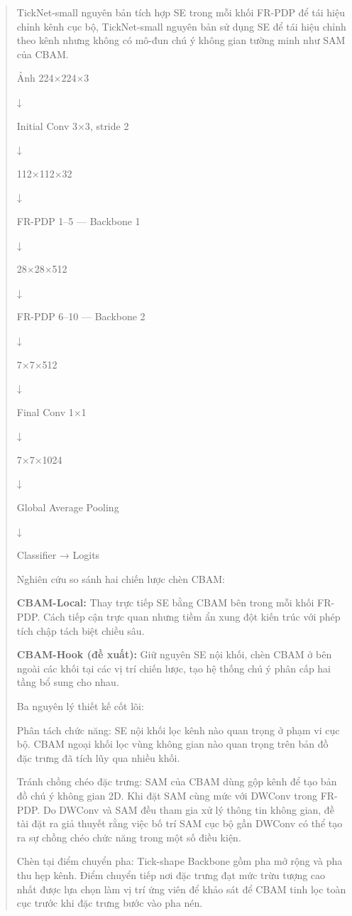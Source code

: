 \documentclass[
  12pt,
  a4paper,
]{report}
\begin{document}
\begin{quote}
TickNet-small nguyên bản tích hợp SE trong mỗi khối FR-PDP để tái hiệu
chỉnh kênh cục bộ, TickNet-small nguyên bản sử dụng SE để tái hiệu chỉnh
theo kênh nhưng không có mô-đun chú ý không gian tường minh như SAM của
CBAM.

Ảnh 224×224×3

↓

Initial Conv 3×3, stride 2

↓

112×112×32

↓

FR-PDP 1--5 --- Backbone 1

↓

28×28×512

↓

FR-PDP 6--10 --- Backbone 2

↓

7×7×512

↓

Final Conv 1×1

↓

7×7×1024

↓

Global Average Pooling

↓

Classifier → Logits

Nghiên cứu so sánh hai chiến lược chèn CBAM:

\textbf{CBAM-Local:} Thay trực tiếp SE bằng CBAM bên trong mỗi khối
FR-PDP. Cách tiếp cận trực quan nhưng tiềm ẩn xung đột kiến trúc với
phép tích chập tách biệt chiều sâu.

\textbf{CBAM-Hook (đề xuất):} Giữ nguyên SE nội khối, chèn CBAM ở bên
ngoài các khối tại các vị trí chiến lược, tạo hệ thống chú ý phân cấp
hai tầng bổ sung cho nhau.

Ba nguyên lý thiết kế cốt lõi:

Phân tách chức năng: SE nội khối lọc kênh nào quan trọng ở phạm vi cục
bộ. CBAM ngoại khối lọc vùng không gian nào quan trọng trên bản đồ đặc
trưng đã tích lũy qua nhiều khối.

Tránh chồng chéo đặc trưng: SAM của CBAM dùng gộp kênh để tạo bản đồ chú
ý không gian 2D. Khi đặt SAM cùng mức với DWConv trong FR-PDP. Do DWConv
và SAM đều tham gia xử lý thông tin không gian, đề tài đặt ra giả thuyết
rằng việc bố trí SAM cục bộ gần DWConv có thể tạo ra sự chồng chéo chức
năng trong một số điều kiện.

Chèn tại điểm chuyển pha: Tick-shape Backbone gồm pha mở rộng và pha thu
hẹp kênh. Điểm chuyển tiếp nơi đặc trưng đạt mức trừu tượng cao nhất
được lựa chọn làm vị trí ứng viên để khảo sát để CBAM tinh lọc toàn cục
trước khi đặc trưng bước vào pha nén.


\end{quote}
\end{document}
